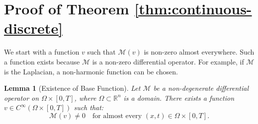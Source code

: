 \documentclass{article}
\theoremstyle{plain}
\newtheorem{lemma}[theorem]{Lemma}
\theoremstyle{definition}
\theoremstyle{remark}
\begin{document}
\appendix
\onecolumn


%



\section{Proof of Theorem \ref{thm:continuous-discrete}}
\label{apx:proof3_1}

We start with a function $v$ such that $\mathcal{M}(v)$ is non-zero almost everywhere. Such a function exists because $\mathcal{M}$ is a non-zero differential operator. For example, if $\mathcal{M}$ is the Laplacian, a non-harmonic function can be chosen.

\begin{lemma}[Existence of Base Function]
    Let $\mathcal{M}$ be a non-degenerate differential operator on $\Omega \times [0,T]$, where $\Omega \subset \mathbb{R}^n$ is a domain. There exists a function $v \in C^\infty(\Omega \times [0,T])$ such that:  
$$
\mathcal{M}(v) \neq 0 \quad \text{for almost every } (x,t) \in \Omega \times [0,T].
$$
\end{lemma}
\end{document}
